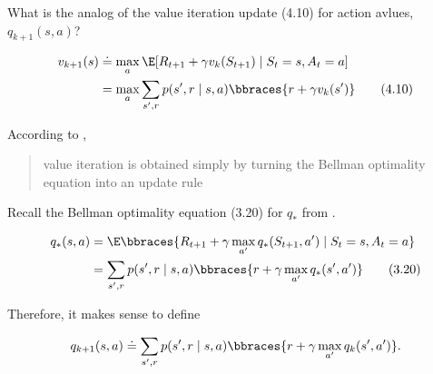 
\begin{exercise}[Exercise 4.10]

What is the analog of the value iteration update (4.10) for action avlues, $q_{k+1}(s, a)$?

\begin{align*}
    v_{k+1}(s)
    & \doteq
    \max_a
        \E[R_{t+1} + \gamma v_k(S_{t+1}) \mid S_t = s, A_t = a] \\
    & =
    \max_a
        \sum_{s^\prime, r}
            p(s^\prime, r \mid s, a)
            \bbraces{r + \gamma v_k(s^\prime)} \tag{4.10}
\end{align*}

\end{exercise}


\begin{solution}

According to \cite*[page 83]{SuttonRichardS2018Rl:a}, \blockquote{value iteration is obtained simply by turning the Bellman optimality equation into an update rule}.
Recall the Bellman optimality equation (3.20) for $q_\ast$ from \cite*[page 64]{SuttonRichardS2018Rl:a}.

\begin{align*}
    q_\ast(s, a)
    & =
    \E
    \bbraces
    {
        R_{t+1} + \gamma \max_{a^\prime} q_\ast(S_{t+1}, a^\prime)
        \mid
        S_t = s, A_t = a
    } \\
    & =
    \sum_{s^\prime, r}
        p(s^\prime, r \mid s, a)
        \bbraces
        {
            r + \gamma \max_{a^\prime} q_\ast(s^\prime, a^\prime)
        } \tag{3.20}
\end{align*}

Therefore, it makes sense to define

\begin{align*}
    q_{k+1}(s, a)
    \doteq
    \sum_{s^\prime, r}
        p(s^\prime, r \mid s, a)
        \bbraces
        {
            r + \gamma \max_{a^\prime} q_k(s^\prime, a^\prime)
        }.
\end{align*}

\end{solution}


